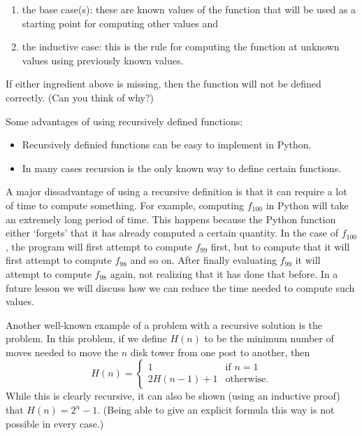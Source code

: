 \documentclass{ximera}
\begin{document}
	\begin{enumerate}
	\item the base case(s): these are known values of the function that will be used as a starting point for computing other values and 
	\item the inductive case: this is the rule for computing the function at unknown values using previously known values.
	\end{enumerate}

If either ingredient above is missing, then the function will not be defined correctly. (Can you think of why?)

Some advantages of using recursively defined functions:

	\begin{itemize}
		\item Recursively definied functions can be easy to implement in Python.
		\item In many cases recursion is the only known way to define certain functions.

	\end{itemize}

A major dissadvantage of using a recursive definition is that it can require a lot of time to compute something. For example, computing $f_{100}$ in Python will take an extremely long period of time. This happens because the Python function either `forgets' that it has already computed a certain quantity. In the case of $f_{100}$, the program will first attempt to compute $f_{99}$ first, but to compute that it will first attempt to compute $f_{98}$ and so on. After finally evaluating $f_{99}$ it will attempt to compute $f_{98}$ again, not realizing that it has done that before. In a future lesson we will discuss how we can reduce the time needed to compute such values.

Another well-known example of a problem with a recursive solution is the  problem. In this problem, if we define $H(n)$ to be the minimum number of moves needed to move the $n$ disk tower from one post to another, then $$H(n) = \begin{cases}1 & \text{if $n=1$}\\ 2H(n-1) + 1 & \text{otherwise.}\end{cases}$$ While this is clearly recursive, it can also be shown (using an inductive proof) that $H(n)=2^n-1$. (Being able to give an explicit formula this way is not possible in every case.)
\end{document}
